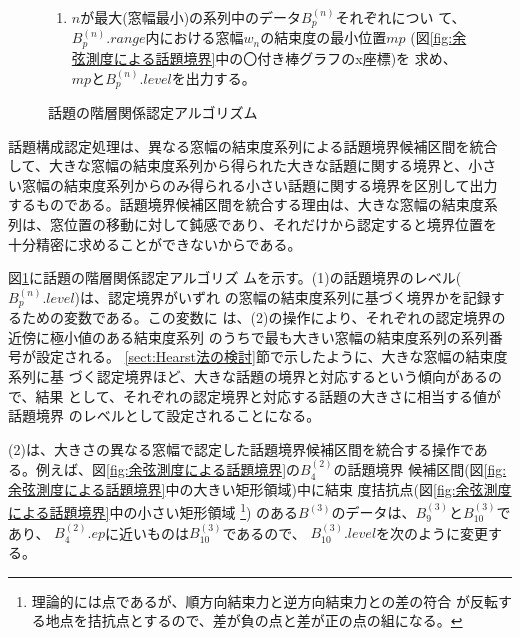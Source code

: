 \begin{figure}[htbp]
\begin{center}
{\begin{minipage}{0.95\textwidth}
\begin{enumerate}
\begin{enumerate}
\begin{enumerate}
          $B^{(n)}_p.range$内で窓幅$w_n$の結束度の最小位置$mp$を求め、
          新たな$B^{(n+1)}_q$を作成し、
          \begin{tabbing}
            $B^{(n+1)}_q.ep \leftarrow  [mp, mp]$\\
            $B^{(n+1)}_q.range \leftarrow [mp-d_{n+1}/2, mp-d_{n+1}/2]$
          \end{tabbing}
          と設定し、$B{^{(n+1)}}$の系列に挿入する。
        \item $B^{(n+1)}_q.level$ ← $B^{(n)}_p.level$
        \end{enumerate}
      \end{enumerate}
    \item $n$が最大(窓幅最小)の系列中のデータ$B^{(n)}_p$それぞれについ
      て、$B^{(n)}_p.range$内における窓幅$w_n$の結束度の最小位置$mp$
      (図\ref{fig:余弦測度による話題境界}中の〇付き棒グラフのx座標)を
      求め、$mp$と$B^{(n)}_p.level$を出力する。
    \end{enumerate}
    \end{minipage}}
    \caption{話題の階層関係認定アルゴリズム}
    \label{fig:話題階層関係認定アルゴリズム}
  \end{center}
\end{figure}

話題構成認定処理は、異なる窓幅の結束度系列による話題境界候補区間を統合
して、大きな窓幅の結束度系列から得られた大きな話題に関する境界と、小さ
い窓幅の結束度系列からのみ得られる小さい話題に関する境界を区別して出力
するものである。話題境界候補区間を統合する理由は、大きな窓幅の結束度系
列は、窓位置の移動に対して鈍感であり、それだけから認定すると境界位置を
十分精密に求めることができないからである。


図\ref{fig:話題階層関係認定アルゴリズム}に話題の階層関係認定アルゴリズ
ムを示す。(1)の話題境界のレベル($B^{(n)}_p.level$)は、認定境界がいずれ
の窓幅の結束度系列に基づく境界かを記録するための変数である。この変数に
は、(2)の操作により、それぞれの認定境界の近傍に極小値のある結束度系列
のうちで最も大きい窓幅の結束度系列の系列番号が設定される。
\ref{sect:Hearst法の検討}節で示したように、大きな窓幅の結束度系列に基
づく認定境界ほど、大きな話題の境界と対応するという傾向があるので、結果
として、それぞれの認定境界と対応する話題の大きさに相当する値が話題境界
のレベルとして設定されることになる。

(2)は、大きさの異なる窓幅で認定した話題境界候補区間を統合する操作であ
る。例えば、図\ref{fig:余弦測度による話題境界}の$B^{(2)}_4$の話題境界
候補区間(図\ref{fig:余弦測度による話題境界}中の大きい矩形領域)中に結束
度拮抗点(図\ref{fig:余弦測度による話題境界}中の小さい矩形領域
\footnote{理論的には点であるが、順方向結束力と逆方向結束力との差の符合
  が反転する地点を拮抗点とするので、差が負の点と差が正の点の組になる。})
のある$B^{(3)}$のデータは、$B^{(3)}_9$と$B^{(3)}_{10}$であり、
$B^{(2)}_4.ep$に近いものは$B^{(3)}_{10}$であるので、
$B^{(3)}_{10}.level$を次のように変更する。

